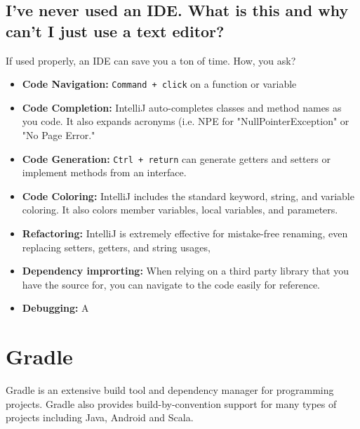 \documentclass[oneside]{book}
\begin{document}
\subsection{I've never used an IDE. What is this and why can't I just use a text editor?}
If used properly, an IDE can save you a ton of time. 
How, you ask?
\begin{itemize}
	\item \textbf{Code Navigation:} \texttt{Command + click} on a function or variable
	\item \textbf{Code Completion:} IntelliJ auto-completes classes and method names as you code. It also expands acronyms (i.e. NPE for "NullPointerException" or "No Page Error."
	\item \textbf{Code Generation:} \texttt{Ctrl + return} can generate getters and setters or implement methods from an interface.
	\item \textbf{Code Coloring:} IntelliJ includes the standard keyword, string, and variable coloring. It also colors member variables, local variables, and parameters.
	\item \textbf{Refactoring:} IntelliJ is extremely effective for mistake-free renaming, even replacing setters, getters, and string usages,
	\item \textbf{Dependency improrting:} When relying on a third party library that you have the source for, you can navigate to the code easily for reference.
	\item \textbf{Debugging:} A 
\end{itemize}
\section{Gradle}
Gradle is an extensive build tool and dependency manager for programming projects. Gradle also provides build-by-convention support for many types of projects including Java, Android and Scala.
\end{document}
